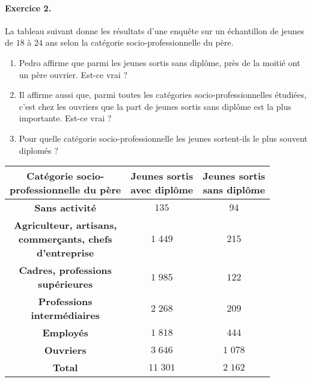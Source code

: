 \documentclass[11pt]{article}
\begin{document}
\paragraph{Exercice 2.} La tableau suivant donne les résultats d'une enquête sur
un échantillon de jeunes de $18$ à $24$ ans selon la catégorie
socio-professionnelle du père.\\[2mm]
\begin{minipage}{.35\textwidth}
  \begin{enumerate}
    \item Pedro affirme que parmi les jeunes sortis sans diplôme, près de la
      moitié ont un père ouvrier. Est-ce vrai ?
    \item Il affirme aussi que, parmi toutes les catégories
      socio-professionnelles étudiées, c'est chez les ouvriers que la part de
      jeunes sortis sans diplôme est la plus importante. Est-ce vrai ?
    \item Pour quelle catégorie socio-professionnelle les jeunes sortent-ils le
      plus souvent diplomés ?
  \end{enumerate}
\end{minipage}
\begin{minipage}{.65\textwidth}
  \begin{center}
\renewcommand{\arraystretch}{1.5}
\begin{tabular}[]{|c|c|c|}
  \hline
  \makecell{\textbf{Catégorie socio-}\\\textbf{professionnelle du père}} &
  \makecell{\textbf{Jeunes sortis}\\\textbf{avec diplôme}} & 
  \makecell{\textbf{Jeunes sortis}\\\textbf{sans diplôme}} \\
  \hline
  \textbf{Sans activité} & $135$ & $94$ \\
  \hline
  \makecell{\textbf{Agriculteur, artisans,}\\\textbf{commerçants,
  chefs}\\\textbf{d'entreprise}} & $1\;449$ & $215$ \\
  \hline
  \makecell{\textbf{Cadres, professions}\\\textbf{supérieures}} & $1\;985$ & $122$
  \\
  \hline
  \makecell{\textbf{Professions}\\\textbf{intermédiaires}} & $2\;268$ & $209$
  \\
  \hline
  \textbf{Employés} & $1\;818$ & $444$ \\
  \hline
  \textbf{Ouvriers} & $3\;646$ & $1\;078$ \\
  \hline
  \textbf{Total} & $11\;301$ & $2\;162$\\
  \hline
\end{tabular}
  \end{center}
\end{minipage}
\end{document}
